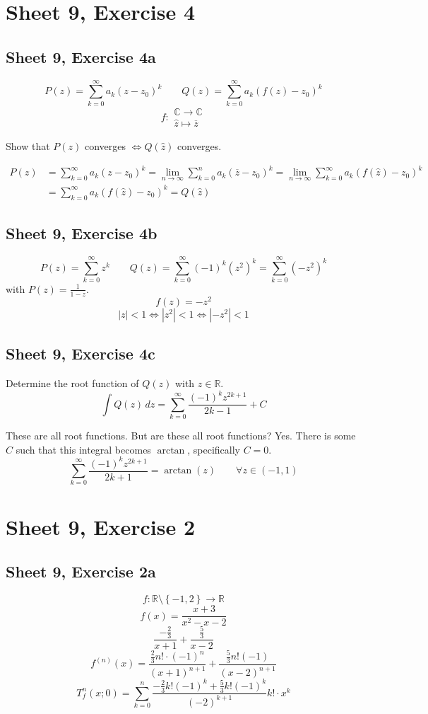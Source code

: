 \documentclass{article}
\newcommand{\set}[1]{\left\{#1\right\}}
\newcommand{\card}[1]{\left|#1\right|}
\begin{document}
\section{Sheet 9, Exercise 4}
\subsection{Sheet 9, Exercise 4a}
\[ P(z) = \sum_{k=0}^\infty a_k (z - z_0)^k \qquad Q(z) = \sum_{k=0}^\infty a_k (f(z) - z_0)^k \]
\[ f: \substack{\mathbb C \to \mathbb C \\ \hat z \mapsto \overline z} \]

Show that $P(z)$ converges $\iff Q(\hat z)$ converges.

\begin{align*}
  P(z) &= \sum_{k=0}^\infty a_k(z - z_0)^k = \lim_{n\to\infty} \sum_{k=0}^n a_k(\overline z - z_0)^k = \lim_{n\to\infty} \sum_{k=0}^\infty a_k (f(\hat z) - z_0)^k \\
    &= \sum_{k=0}^\infty a_k (f(\hat z) - z_0)^k = Q(\hat z)
\end{align*}

\subsection{Sheet 9, Exercise 4b}
\[ P(z) = \sum_{k=0}^\infty z^k  \qquad Q(z) = \sum_{k=0}^\infty (-1)^k (z^2)^k = \sum_{k=0}^\infty (-z^2)^k \]
with $P(z) = \frac{1}{1 - z}$.
\[ f(z) = -z^2 \]
\[ \card{z} < 1 \iff \card{z^2} < 1 \iff \card{-z^2} < 1 \]

\subsection{Sheet 9, Exercise 4c}
Determine the root function of $Q(z)$ with $z \in \mathbb R$.
\[ \int Q(z) \, dz = \sum_{k=0}^\infty \frac{(-1)^k z^{2k+1}}{2k - 1} + C \]

These are all root functions. But are these all root functions? Yes.
There is some $C$ such that this integral becomes $\arctan$, specifically $C = 0$.
\[ \sum_{k=0}^\infty \frac{(-1)^k z^{2k+1}}{2k+1} = \arctan(z) \qquad \forall z \in (-1, 1) \]

\section{Sheet 9, Exercise 2}
\subsection{Sheet 9, Exercise 2a}
\[ f: \mathbb R \setminus \set{-1, 2} \to \mathbb R \]
\[ f(x) = \frac{x + 3}{x^2 - x - 2} \]
\[ \frac{-\frac23}{x + 1} + \frac{\frac53}{x - 2} \]
\[ f^{(n)}(x) = \frac{\frac23 n! \cdot (-1)^n}{(x + 1)^{n+1}} + \frac{\frac53 n! (-1)}{(x - 2)^{n + 1}} \]
\[ T_f^n(x; 0) = \sum_{k=0}^n \frac{-\frac23 k! (-1)^k + \frac53 k! (-1)^k}{(-2)^{k+1}}{k!} \cdot x^k \]
\end{document}
